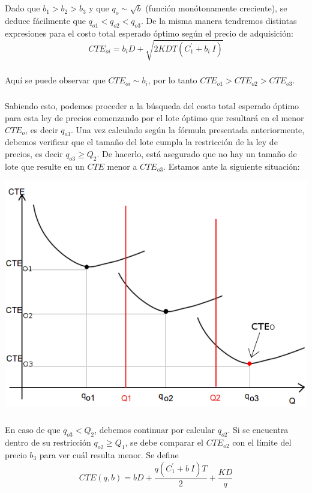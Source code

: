 \documentclass{article}
\begin{document}
	\subparagraph{} Dado que $b_1 > b_2 > b_3$ y que $q_o \sim \sqrt b$ (función monótonamente creciente), se deduce fácilmente que $q_{o1} < q_{o2} < q_{o3}$. De la misma manera tendremos distintas expresiones para el costo total esperado óptimo según el precio de adquisición:
	$$ CTE_{oi} = b_iD + \sqrt{ 2KDT \left( C_1^{'} + b_i\ I \right) } $$

	\subparagraph{} Aquí se puede observar que $CTE_{oi} \sim b_i$, por lo tanto $CTE_{o1} > CTE_{o2} > CTE_{o3}$.

	\subparagraph{} Sabiendo esto, podemos proceder a la búsqueda del costo total esperado óptimo para esta ley de precios comenzando por el lote óptimo que resultará en el menor $CTE_o$, es decir $q_{o3}$. Una vez calculado según la fórmula presentada anteriormente, debemos verificar que el tamaño del lote cumpla la restricción de la ley de precios, es decir $q_{o3} \geq Q_2$. De hacerlo, está asegurado que no hay un tamaño de lote que resulte en un $CTE$ menor a $CTE_{o3}$. Estamos ante la siguiente situación:

	\begin{center}
	\includegraphics[scale=0.4,keepaspectratio=true]{img/6/6_CTE_3.png} 
	\end{center}

	\subparagraph{} En caso de que $q_{o3} < Q_2$, debemos continuar por calcular $q_{o2}$. Si se encuentra dentro de su restricción $q_{o2} \geq Q_1$, se debe comparar el $CTE_{o2}$ con el límite del precio $b_3$ para ver cuál resulta menor. Se define
	$$ CTE(q,b) = bD + \frac{q \left( C_1^{'} + b\ I \right) T}{2} + \frac{KD}{q} $$
\end{document}
